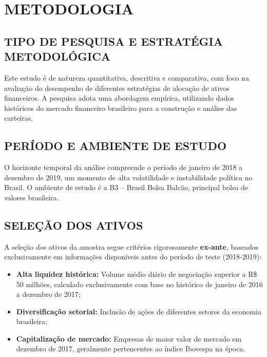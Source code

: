 
\chapter{METODOLOGIA}

\section{TIPO DE PESQUISA E ESTRATÉGIA METODOLÓGICA}

Este estudo é de natureza quantitativa, descritiva e comparativa, com foco na avaliação do desempenho de diferentes estratégias de alocação de ativos financeiros. A pesquisa adota uma abordagem empírica, utilizando dados históricos do mercado financeiro brasileiro para a construção e análise das carteiras.

\section{PERÍODO E AMBIENTE DE ESTUDO}

O horizonte temporal da análise compreende o período de janeiro de 2018 a dezembro de 2019, um momento de alta volatilidade e instabilidade política no Brasil. O ambiente de estudo é a B3 -- Brasil Bolsa Balcão, principal bolsa de valores brasileira.

\section{SELEÇÃO DOS ATIVOS}

A seleção dos ativos da amostra segue critérios rigorosamente \textbf{ex-ante}, baseados exclusivamente em informações disponíveis antes do período de teste (2018-2019):

\begin{itemize}
    \item \textbf{Alta liquidez histórica:} Volume médio diário de negociação superior a R\$ 50 milhões, calculado exclusivamente com base no histórico de janeiro de 2016 a dezembro de 2017;
    
    \item \textbf{Diversificação setorial:} Inclusão de ações de diferentes setores da economia brasileira;
    
    \item \textbf{Capitalização de mercado:} Empresas de maior valor de mercado em dezembro de 2017, geralmente pertencentes ao índice Ibovespa na época.
\end{itemize}

